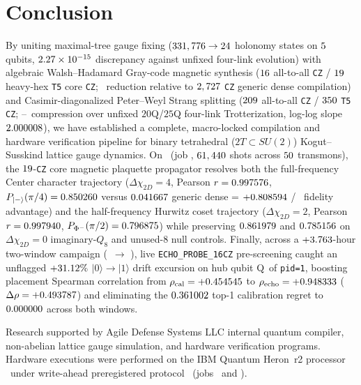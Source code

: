 \documentclass[aps,prx,twocolumn,superscriptaddress,nofootinbib]{revtex4-2}
\begin{document}


\section{Conclusion}

By uniting maximal-tree gauge fixing ($331,776 \to 24$ holonomy states on $5$ qubits, $2.27 \times 10^{-15}$ discrepancy against unfixed four-link evolution) with algebraic Walsh--Hadamard Gray-code magnetic synthesis ($16$ all-to-all \texttt{CZ} / $19$ heavy-hex \texttt{T5} core \texttt{CZ}; \BTPlaqFezCzReductionRatio\ reduction relative to $2,727$ \texttt{CZ} generic dense compilation) and Casimir-diagonalized Peter--Weyl Strang splitting ($209$ all-to-all \texttt{CZ} / $350$ \texttt{T5} \texttt{CZ}; \BTPlaqCompTwentyQAtaRatio--\BTPlaqCompTwentyFiveQHhRatio\ compression over unfixed $20$Q/$25$Q four-link Trotterization, log-log slope $2.000008$), we have established a complete, macro-locked compilation and hardware verification pipeline for binary tetrahedral ($2T \subset SU(2)$) Kogut--Susskind lattice gauge dynamics. On \BTPlaqFezBackend\ (job \BTPlaqFezJobId, $61,440$ shots across $50$ transmons), the $19$-\texttt{CZ} core magnetic plaquette propagator resolves both the full-frequency Center character trajectory ($\Delta\chi_{2D} = 4$, Pearson $r = 0.997576$, $P_{|-\rangle}(\pi/4) = 0.850260$ versus $0.041667$ generic dense = $+0.808594$ / \BTPlaqPidZeroCenterStructFidelityRatio\ fidelity advantage) and the half-frequency Hurwitz coset trajectory ($\Delta\chi_{2D} = 2$, Pearson $r = 0.997940$, $P_{\Phi^-}(\pi/2) = 0.796875$) while preserving $0.861979$ and $0.785156$ on $\Delta\chi_{2D} = 0$ imaginary-$Q_8$ and unused-$8$ null controls. Finally, across a $+3.763$-hour two-window campaign (\BTPlaqFezWindowOneJobId\ $\to$ \BTPlaqFezJobId), live \texttt{ECHO\_PROBE\_16CZ} pre-screening caught an unflagged $+31.12\%$ $|0\rangle\to|1\rangle$ drift excursion on hub qubit Q\BTPlaqDriftedHubQubit\ of \texttt{pid=1}, boosting placement Spearman correlation from $\rho_{\mathrm{cal}} = +0.454545$ to $\rho_{\mathrm{echo}} = +0.948333$ ($\Delta\rho = +0.493787$) and eliminating the $0.361002$ top-1 calibration regret to $0.000000$ across both windows.

\begin{acknowledgments}
Research supported by Agile Defense Systems LLC internal quantum compiler, non-abelian lattice gauge simulation, and hardware verification programs. Hardware executions were performed on the IBM Quantum Heron~r2 processor \BTPlaqFezBackend\ under write-ahead preregistered protocol \BTPlaqFezProtocolId\ (jobs \BTPlaqFezWindowOneJobId\ and \BTPlaqFezJobId).
\end{acknowledgments}


\end{document}
